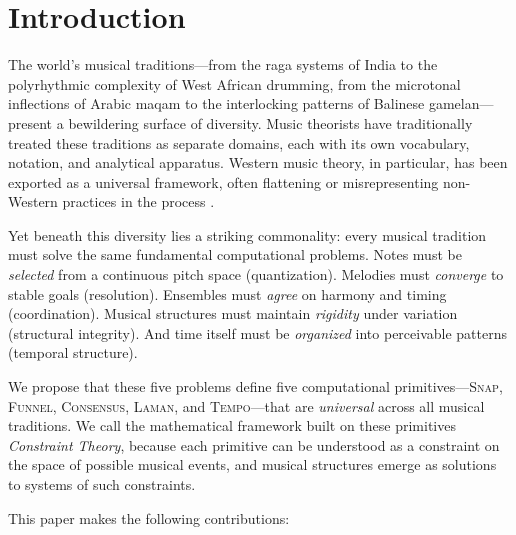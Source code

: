 \documentclass[cmj]{article}
\newcommand{\SNAP}{\textsc{Snap}}
\newcommand{\FUNNEL}{\textsc{Funnel}}
\newcommand{\CONSENSUS}{\textsc{Consensus}}
\newcommand{\LAMAN}{\textsc{Laman}}
\newcommand{\TEMPO}{\textsc{Tempo}}
\begin{document}
\section{Introduction}
\label{sec:intro}

The world's musical traditions---from the raga systems of India to the
polyrhythmic complexity of West African drumming, from the microtonal
inflections of Arabic maqam to the interlocking patterns of Balinese
gamelan---present a bewildering surface of diversity. Music theorists have
traditionally treated these traditions as separate domains, each with its own
vocabulary, notation, and analytical apparatus. Western music theory, in
particular, has been exported as a universal framework, often flattening or
misrepresenting non-Western practices in the process
\citep{nettle2015contrasting,agawu2003representing}.

Yet beneath this diversity lies a striking commonality: every musical tradition
must solve the same fundamental computational problems. Notes must be
\emph{selected} from a continuous pitch space (quantization). Melodies must
\emph{converge} to stable goals (resolution). Ensembles must \emph{agree} on
harmony and timing (coordination). Musical structures must maintain
\emph{rigidity} under variation (structural integrity). And time itself must be
\emph{organized} into perceivable patterns (temporal structure).

We propose that these five problems define five computational
primitives---\SNAP{}, \FUNNEL{}, \CONSENSUS{}, \LAMAN{}, and \TEMPO{}---that
are \emph{universal} across all musical traditions. We call the mathematical
framework built on these primitives \emph{Constraint Theory}, because each
primitive can be understood as a constraint on the space of possible musical
events, and musical structures emerge as solutions to systems of such
constraints.

This paper makes the following contributions:
\end{document}
